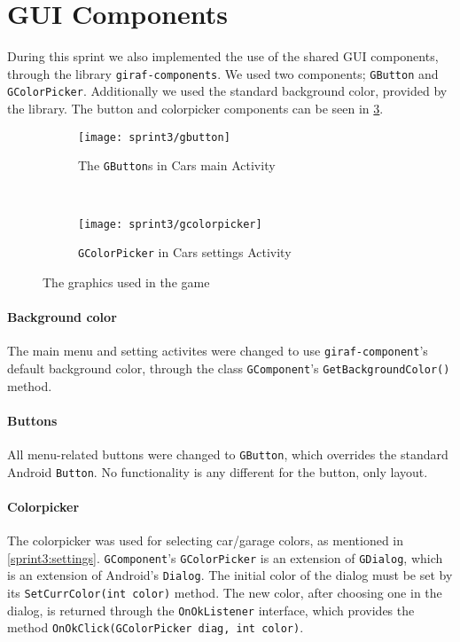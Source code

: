 \section{GUI Components}\label{sprint3:gui}
During this sprint we also implemented the use of the shared GUI components, through the library \lstinline|giraf-components|.
We used two components; \lstinline|GButton| and \lstinline|GColorPicker|.
Additionally we used the standard background color, provided by the library.
The button and colorpicker components can be seen in \cref{sprint3:guicomponents:fig}.

\begin{figure}[h]
\begin{subfigure}{0.49\textwidth}
\centering
\texttt{[image: sprint3/gbutton]}
\caption{The \lstinline|GButton|s in Cars main Activity}
\label{sprint3:guicomponents:fig:gbutton}
\end{subfigure}
~
\begin{subfigure}{0.49\textwidth}
\centering
\texttt{[image: sprint3/gcolorpicker]}
\caption{\lstinline|GColorPicker| in Cars settings Activity}
\label{sprint3:guicomponents:fig:gcolorpicker}
\end{subfigure}

\caption{The graphics used in the game}
\label{sprint3:guicomponents:fig}
\end{figure}

\paragraph{Background color}
The main menu and setting activites were changed to use \lstinline|giraf-component|'s default background color, through the class \lstinline|GComponent|'s \lstinline|GetBackgroundColor()| method.

\paragraph{Buttons}
All menu-related buttons were changed to \lstinline|GButton|, which overrides the standard Android \lstinline|Button|.
No functionality is any different for the button, only layout.

\paragraph{Colorpicker}
The colorpicker was used for selecting car/garage colors, as mentioned in \cref{sprint3:settings}.
\lstinline|GComponent|'s \lstinline|GColorPicker| is an extension of \lstinline|GDialog|, which is an extension of Android's \lstinline|Dialog|.
The initial color of the dialog must be set by its \lstinline|SetCurrColor(int color)| method.
The new color, after choosing one in the dialog, is returned through the \lstinline|OnOkListener| interface, which provides the method \lstinline|OnOkClick(GColorPicker diag, int color)|.